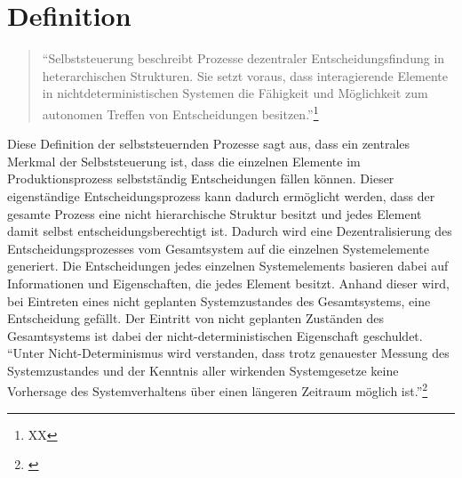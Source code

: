 \section{Definition}
\label{sec:Definition}

\begin{quote}
“Selbststeuerung beschreibt Prozesse dezentraler Entscheidungsfindung in heterarchischen Strukturen. 
Sie setzt voraus, dass interagierende Elemente in nichtdeterministischen Systemen die Fähigkeit und 
Möglichkeit zum autonomen Treffen von Entscheidungen besitzen.”\footnote{XX}
\end{quote}

Diese Definition der selbststeuernden Prozesse sagt aus, dass ein zentrales Merkmal der Selbststeuerung 
ist, dass die einzelnen Elemente im Produktionsprozess selbstständig Entscheidungen fällen können. 
Dieser eigenständige Entscheidungsprozess kann dadurch ermöglicht werden, dass der gesamte Prozess 
eine nicht hierarchische Struktur besitzt und jedes Element damit selbst entscheidungsberechtigt ist. 
Dadurch wird eine Dezentralisierung des Entscheidungsprozesses vom Gesamtsystem auf die einzelnen 
Systemelemente generiert. Die Entscheidungen jedes einzelnen Systemelements basieren dabei auf Informationen 
und Eigenschaften, die jedes Element besitzt. Anhand dieser wird, bei Eintreten eines nicht geplanten 
Systemzustandes des Gesamtsystems, eine Entscheidung  gefällt. Der Eintritt von nicht geplanten Zuständen 
des Gesamtsystems ist dabei der nicht-deterministischen Eigenschaft geschuldet.
"`Unter Nicht-Determinismus wird verstanden, dass trotz genauester Messung des Systemzustandes 
und der Kenntnis aller wirkenden Systemgesetze keine Vorhersage des Systemverhaltens über einen längeren Zeitraum 
möglich ist."'\footnote{\citet[S.~15]{boese2012}}